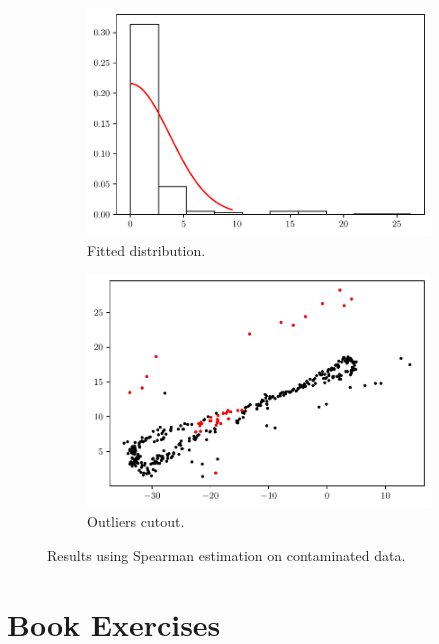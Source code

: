 \documentclass[11pt]{article}
\theoremstyle{definition}
\theoremstyle{remark}
\theoremstyle{remark}
\begin{document}
\begin{figure}[H]
  \centering
  \begin{subfigure}[t]{0.475\textwidth}
    \centering
    \includegraphics[scale=0.45]{../figs/spearman_hist_with-noise.pdf}
    \caption{Fitted distribution.}
  \end{subfigure}
  \begin{subfigure}[t]{0.475\textwidth}
    \centering
    \includegraphics[scale=0.45]{../figs/spearman_scatter_with-noise.pdf}
    \caption{Outliers cutout.}
  \end{subfigure}
  \caption{Results using Spearman estimation on contaminated data.}
  \label{fig:spearman_cut_wnoise}
\end{figure}


\section{Book Exercises}
\end{document}
